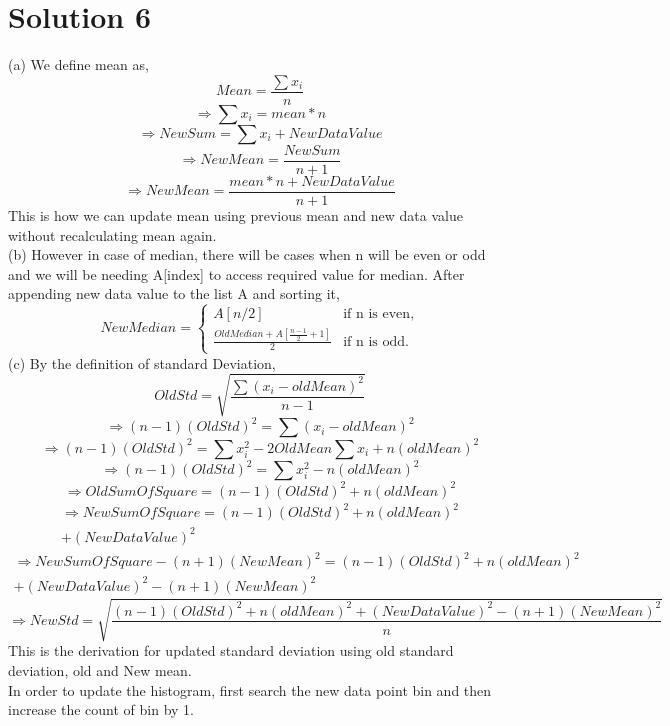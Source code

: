 \documentclass[fleqn]{article}
\begin{document}
\section{Solution 6}
(a) We define mean as,
\[
    Mean=\frac{\sum {x_{i}}}{n}
\]
\[
\Rightarrow \sum {x_{i}} = mean * n
\]
\[
\Rightarrow NewSum =  \sum {x_{i}} + NewDataValue
\]
\[
\Rightarrow NewMean = \frac{NewSum}{n+1}
\]
\[
\Rightarrow NewMean = \frac{mean * n + NewDataValue}{n+1}
\]
This is how we can update mean using previous mean and new data value without recalculating mean again.\\
(b) However in case of median, there will be cases when n will be even or odd and we will be needing A[index] to access required value for median.
After appending new data value to the list A and sorting it,
\[
NewMedian=\begin{cases} 
A[n/2] & \text{if n is even} , \\
\frac{OldMedian+A[\frac{n-1}{2}+1]}{2} & \text{if n is odd}.
\end{cases}
\]
(c) By the definition of standard Deviation,
\[
OldStd=\sqrt{\frac{\sum{(x_{i}-oldMean)^2}}{n-1}}
\]
\[
\Rightarrow(n-1)(OldStd)^2 = \sum{(x_{i}-oldMean)^2}
\]
\[
\Rightarrow(n-1)(OldStd)^2 = \sum{x_{i}^2} - 2OldMean\sum{x_{i}} + n(oldMean)^2
\]
\[
\Rightarrow(n-1)(OldStd)^2 = \sum{x_{i}^2} -n(oldMean)^2
\]
\[
\Rightarrow OldSumOfSquare = (n-1)(OldStd)^2 + n(oldMean)^2
\]
\begin{multline*}
    \Rightarrow NewSumOfSquare = (n-1)(OldStd)^2 + n(oldMean)^2\\ + (NewDataValue)^2
\end{multline*}
\begin{multline*}
    \Rightarrow NewSumOfSquare - (n+1)(NewMean)^2 = (n-1)(OldStd)^2 + n(oldMean)^2\\  + (NewDataValue)^2 - (n+1)(NewMean)^2
\end{multline*}
\[
\Rightarrow NewStd = \sqrt{\frac{(n-1)(OldStd)^2 + n(oldMean)^2 + (NewDataValue)^2 - (n+1)(NewMean)^2}{n}}
\]
This is the derivation for updated standard deviation using old standard deviation, old and New mean.\\
In order to update the histogram, first search the new data point bin and then increase the count of bin by 1.
\end{document}
